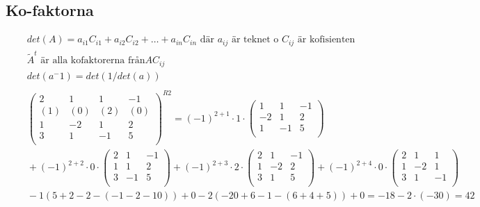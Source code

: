 \subsection{Ko-faktorna}
\begin{align*} %
  &\quad  det(A) = a_{i1}C_{i1}+a_{i2}C_{i2}+\ldots{}+a_{in}C_{in} \text{ där $a_{ij}$ är teknet o $C_{ij}$ är kofisienten} \\
  &\quad  \tilde{A}^t \text{ är alla kofaktorerna från} A C_{ij} \\
  &\quad  det(a^-1)=det(1/det(a)) \\
  &\quad   \\
  &\quad
  \left(\begin{array}{cccc}
    2 & 1  & 1  & -1  \\
    (1) & (0)  & (2)  & (0)  \\
    1 & -2 & 1  & 2  \\
    3 & 1  & -1 & 5  \\
  \end{array}\right)^{R2} =  (-1)^{2+1}\cdot{1}\cdot{}
  \left(\begin{array}{ccc}
    1  & 1  & -1  \\
    -2 & 1  & 2  \\
    1  & -1 & 5  \\
  \end{array}\right) \\
  &\quad + (-1)^{2+2}\cdot{0}\cdot{} 
  \left(\begin{array}{ccc}
    2 & 1  & -1  \\
    1 & 1  & 2  \\
    3 & -1  & 5  \\
  \end{array}\right) + (-1)^{2+3}\cdot{2}\cdot{}
  \left(\begin{array}{ccc}
    2 & 1  & -1  \\
    1 & -2 & 2  \\
    3 & 1  & 5  \\
  \end{array}\right) + (-1)^{2+4}\cdot{0}\cdot{}
  \left(\begin{array}{ccc}
    2 & 1  & 1  \\
    1 & -2 & 1  \\
    3 & 1  & -1  \\
  \end{array}\right) \\
  &\quad  -1(5+2-2-(-1-2-10))+0-2(-20+6-1-(6+4+5))+0 = -18-2\cdot{(-30)} = 42 \\
\end{align*}

